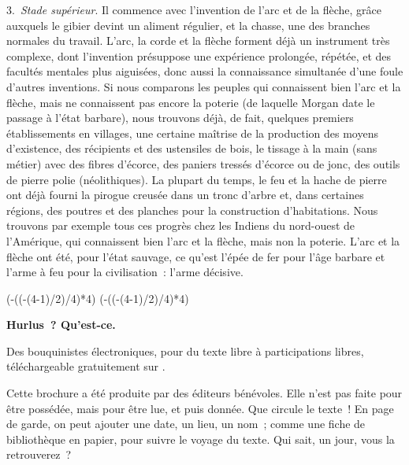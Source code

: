 \documentclass[french,twoside]{book} %
\def\truncdiv#1#2{((#1-(#2-1)/2)/#2)}
\def\moduloop#1#2{(#1-\truncdiv{#1}{#2}*#2)}
\def\modulo#1#2{\number\numexpr\moduloop{#1}{#2}\relax}
\begin{document}
3. \emph{Stade supérieur}. Il commence avec l’invention de l’arc et de la flèche, grâce auxquels le gibier devint un aliment régulier, et la chasse, une des branches normales du travail. L’arc, la corde et la flèche forment déjà un instrument très complexe, dont l’invention présuppose une expérience prolongée, répétée, et des facultés mentales plus aiguisées, donc aussi la connaissance simultanée d’une foule d’autres inventions. Si nous comparons les peuples qui connaissent bien l’arc et la flèche, mais ne connaissent pas encore la poterie (de laquelle Morgan date le passage à l’état barbare), nous trouvons déjà, de fait, quelques premiers établissements en villages, une certaine maîtrise de la production des moyens d’existence, des récipients et des ustensiles de bois, le tissage à la main (sans métier) avec des fibres d’écorce, des paniers tressés d’écorce ou de jonc, des outils de pierre polie (néolithiques). La plupart du temps, le feu et la hache de pierre ont déjà fourni la pirogue creusée dans un tronc d’arbre et, dans certaines régions, des poutres et des planches pour la construction d’habitations. Nous trouvons par exemple tous ces progrès chez les Indiens du nord-ouest de l’Amérique, qui connaissent bien l’arc et la flèche, mais non la poterie. L’arc et la flèche ont été, pour l’état sauvage, ce qu’est l’épée de fer pour l’âge barbare et l’arme à feu pour la civilisation : l’arme décisive.
 


\ifbooklet
  \pagestyle{empty}
  \clearpage
  \ifnum\modulo{\value{page}}{4}=0 \hbox{}\newpage\hbox{}\newpage\fi
  \ifnum\modulo{\value{page}}{4}=1 \hbox{}\newpage\hbox{}\newpage\fi


  \hbox{}\newpage
  \ifodd\value{page}\hbox{}\newpage\fi
  {\centering\color{rubric}\bfseries\noindent\large
    Hurlus ? Qu’est-ce.\par
    \bigskip
  }
  \noindent Des bouquinistes électroniques, pour du texte libre à participations libres,
  téléchargeable gratuitement sur \href{https://hurlus.fr}{}.\par
  \bigskip
  \noindent Cette brochure a été produite par des éditeurs bénévoles.
  Elle n’est pas faite pour être possédée, mais pour être lue, et puis donnée.
  Que circule le texte !
  En page de garde, on peut ajouter une date, un lieu, un nom ;
  comme une fiche de bibliothèque en papier,
  pour suivre le voyage du texte. Qui sait, un jour, vous la retrouverez ?
  \par
\end{document}
